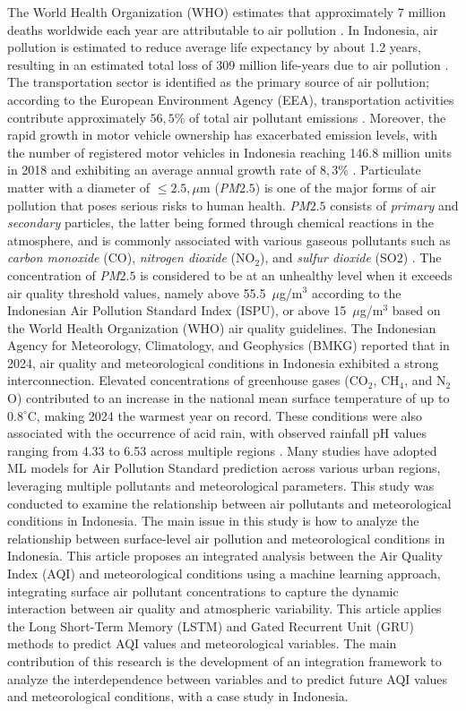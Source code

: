 \documentclass[pdflatex,sn-mathphys-num]{sn-jnl}%
\theoremstyle{thmstyleone}%
\theoremstyle{thmstyletwo}%
\theoremstyle{thmstylethree}%
\begin{document}
	The World Health Organization (WHO) estimates that approximately 7 million deaths worldwide each year are attributable to air pollution \cite{WHO2024}. In Indonesia, air pollution is estimated to reduce average life expectancy by about 1.2 years, resulting in an estimated total loss of 309 million life-years due to air pollution \cite{Madrigano2024}. The transportation sector is identified as the primary source of air pollution; according to the European Environment Agency (EEA), transportation activities contribute approximately $56{,}5\%$ of total air pollutant emissions \cite{EEA2022Transport}. Moreover, the rapid growth in motor vehicle ownership has exacerbated emission levels, with the number of registered motor vehicles in Indonesia reaching 146.8 million units in 2018 and exhibiting an average annual growth rate of $8{,}3\%$ \cite{Dimension2022}.
	Particulate matter with a diameter of $\leq 2.5,\mu\text{m}$ (\textit{PM}${2.5}$) is one of the major forms of air pollution that poses serious risks to human health. \textit{PM}${2.5}$ consists of {\itshape primary} and {\itshape secondary} particles, the latter being formed through chemical reactions in the atmosphere, and is commonly associated with various gaseous pollutants such as {\itshape carbon monoxide} (CO), {\itshape nitrogen dioxide} (NO$_2$), and {\itshape sulfur dioxide} (SO$2$) \cite{Shu2024} . The concentration of \textit{PM}${2.5}$ is considered to be at an unhealthy level when it exceeds air quality threshold values, namely above 55.5~$\mu$g/m$^3$ according to the Indonesian Air Pollution Standard Index (ISPU), or above 15~$\mu$g/m$^3$ based on the World Health Organization (WHO) air quality guidelines.
	The Indonesian Agency for Meteorology, Climatology, and Geophysics (BMKG) reported that in 2024, air quality and meteorological conditions in Indonesia exhibited a strong interconnection. Elevated concentrations of greenhouse gases (CO$_2$, CH$_4$, and N$_2$O) contributed to an increase in the national mean surface temperature of up to $0.8^{\circ}\mathrm{C}$, making 2024 the warmest year on record. These conditions were also associated with the occurrence of acid rain, with observed rainfall pH values ranging from 4.33 to 6.53 across multiple regions \cite{BidangKlimatologiBadanMeteorologi2024}.
	Many studies have adopted ML models for Air Pollution Standard prediction across various urban regions, leveraging multiple pollutants and meteorological parameters.
	This study was conducted to examine the relationship between air pollutants and meteorological conditions in Indonesia. The main issue in this study is how to analyze the relationship between surface-level air pollution and meteorological conditions in Indonesia. This article proposes an integrated analysis between the Air Quality Index (AQI) and meteorological conditions using a machine learning approach, integrating surface air pollutant concentrations to capture the dynamic interaction between air quality and atmospheric variability. This article applies the Long Short-Term Memory (LSTM) and Gated Recurrent Unit (GRU) methods to predict AQI values and meteorological variables. The main contribution of this research is the development of an integration framework to analyze the interdependence between variables and to predict future AQI values and meteorological conditions, with a case study in Indonesia.
\end{document}
